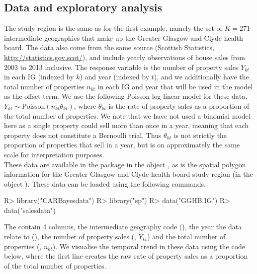 \documentclass[article, nojss]{jss}
\begin{document}
\subsection{Data and exploratory analysis}
The study region is the same as for the first example, namely the set of $K=271$ intermediate geographies that make up the Greater Glasgow and Clyde health board. The data also come from the same source (Scottish Statistics, \url{http://statistics.gov.scot/}), and include yearly observations of house sales from 2003 to 2013 inclusive. The response variable is the number of property sales $Y_{kt}$ in each IG (indexed by $k$) and year (indexed by $t$), and we additionally have the total number of properties $n_{kt}$ in each IG and year that will be used in the model as the offset term. We use the following Poisson log-linear model for these data, $Y_{kt}\sim\mbox{Poisson}(n_{kt}\theta_{kt})$, where $\theta_{kt}$ is the rate of property sales as a proportion of the total number of properties. We note that we have not used a binomial model here as a single property could sell more than once in a year, meaning that each property does not constitute a Bernoulli trial. Thus $\theta_{kt}$ is not strictly the proportion of properties that sell in a year, but is on approximately the same scale for interpretation purposes.\\

These data are available in the  package in the object , as is the spatial polygon information for the Greater Glasgow and Clyde health board study region (in the object ). These data can be loaded using the following commands.



\begin{Schunk}
\begin{Sinput}
R> library("CARBayesdata")
R> library("sp")
R> data("GGHB.IG")
R> data("salesdata")
\end{Sinput}
\end{Schunk}


The   contain 4 columns, the intermediate geography code (), the year the data relate to (), the number of property sales (, $Y_{kt}$) and the total number of properties (, $n_{kt}$). We visualise the temporal trend in these data using the code below, where the first line creates the raw rate of property sales as a proportion of the total number of properties.

\begin{Schunk}
\end{Schunk}
\end{document}
